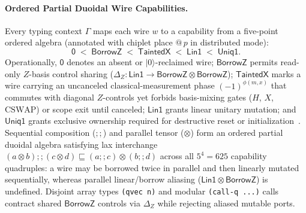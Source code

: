 \documentclass[acmsmall,screen,anonymous]{acmart}
\DeclareRobustCommand{\_}{\ifmmode\text{\char95}\else\char95\penalty0\relax\fi}
\theoremstyle{plain}
\newcommand{\CapZero}{\ensuremath{\mathsf{0}}}
\newcommand{\CapBorrowZ}{\ensuremath{\mathsf{BorrowZ}}}
\newcommand{\CapTaintedX}{\ensuremath{\mathsf{TaintedX}}}
\newcommand{\CapLin}{\ensuremath{\mathsf{Lin1}}}
\newcommand{\CapUniq}{\ensuremath{\mathsf{Uniq1}}}
\begin{document}
\paragraph{Ordered Partial Duoidal Wire Capabilities.}
Every typing context $\Gamma$ maps each wire $w$ to a capability from a five-point ordered algebra (annotated with chiplet place $@\,p$ in distributed mode):
\[
  \CapZero \;<\; \CapBorrowZ \;<\; \CapTaintedX \;<\; \CapLin \;<\; \CapUniq.
\]
Operationally, $\CapZero$ denotes an absent or $|0\rangle$-reclaimed wire; $\CapBorrowZ$ permits read-only $Z$-basis control sharing ($\Delta_Z : \CapLin \to \CapBorrowZ \otimes \CapBorrowZ$); $\CapTaintedX$ marks a wire carrying an uncanceled classical-measurement phase $(-1)^{\phi(m,x)}$ that commutes with diagonal $Z$-controls yet forbids basis-mixing gates ($H$, $X$, $\mathrm{CSWAP}$) or scope exit until canceled; $\CapLin$ grants linear unitary mutation; and $\CapUniq$ grants exclusive ownership required for destructive reset or initialization~\cite{marshall2022entente}. Sequential composition ($\mathbin{;;}$) and parallel tensor ($\otimes$) form an ordered partial duoidal algebra satisfying lax interchange $(a \otimes b) \mathbin{;;} (c \otimes d) \sqsubseteq (a \mathbin{;;} c) \otimes (b \mathbin{;;} d)$ across all $5^4 = 625$ capability quadruples: a wire may be borrowed twice in parallel and then linearly mutated sequentially, whereas parallel linear/borrow aliasing ($\CapLin \otimes \CapBorrowZ$) is undefined. Disjoint array types \texttt{(qvec n)} and modular \texttt{(call-q ...)} calls contract shared $\CapBorrowZ$ controls via $\Delta_Z$ while rejecting aliased mutable ports.
\end{document}
